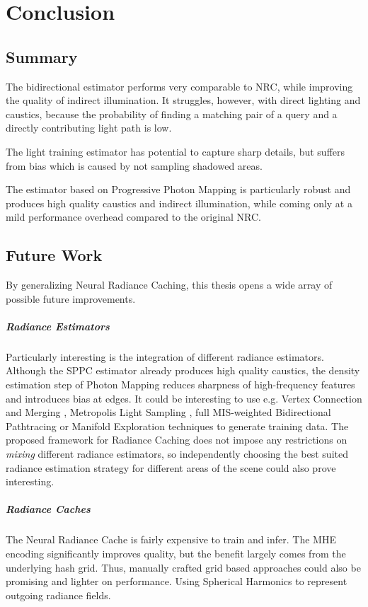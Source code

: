 
\chapter{Conclusion}
\label{chap:conclusion}

\section{Summary}
The bidirectional estimator performs very comparable to NRC, while improving the quality of indirect illumination.
It struggles, however, with direct lighting and caustics, because the probability of finding a matching pair of a query and a directly contributing light path is low.

The light training estimator has potential to capture sharp details, but suffers from bias which is caused by not sampling shadowed areas.

The estimator based on Progressive Photon Mapping is particularly robust and produces high quality caustics and indirect illumination, while coming only at a mild performance overhead compared to the original NRC.

\section{Future Work}
By generalizing Neural Radiance Caching, this thesis opens a wide array of possible future improvements.

\paragraph{Radiance Estimators}
Particularly interesting is the integration of different radiance estimators.
Although the SPPC estimator already produces high quality caustics, the density estimation step of Photon Mapping reduces sharpness of high-frequency features and introduces bias at edges.
It could be interesting to use e.g. Vertex Connection and Merging \parencite{georgiev2012}, Metropolis Light Sampling \parencite{veach1997a}, full MIS-weighted Bidirectional Pathtracing \parencite{lafortune1993,veach1997} or Manifold Exploration techniques \parencite{jakob2012} to generate training data.
The proposed framework for Radiance Caching does not impose any restrictions on \emph{mixing} different radiance estimators, so independently choosing the best suited radiance estimation strategy for different areas of the scene could also prove interesting.

\paragraph{Radiance Caches}
The Neural Radiance Cache is fairly expensive to train and infer.
The MHE encoding significantly improves quality, but the benefit largely comes from the underlying hash grid.
Thus, manually crafted grid based approaches could also be promising and lighter on performance.
Using Spherical Harmonics to represent outgoing radiance fields.

